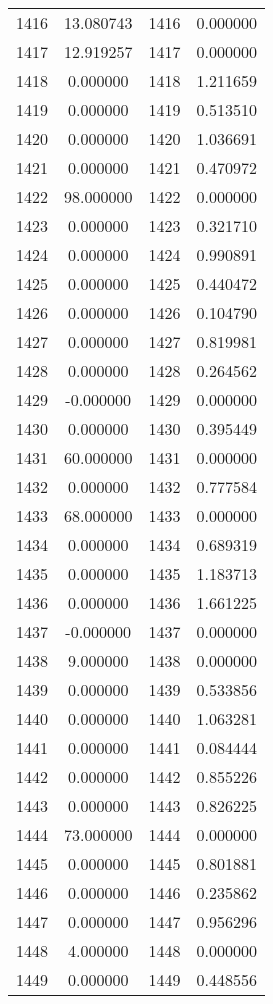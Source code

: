 \documentclass[12pt]{article}
\begin{document}
\begin{longtable}{@{}cccc@{}}
1416 & 13.080743 & 1416 & 0.000000 \\
1417 & 12.919257 & 1417 & 0.000000 \\
1418 & 0.000000 & 1418 & 1.211659 \\
1419 & 0.000000 & 1419 & 0.513510 \\
1420 & 0.000000 & 1420 & 1.036691 \\
1421 & 0.000000 & 1421 & 0.470972 \\
1422 & 98.000000 & 1422 & 0.000000 \\
1423 & 0.000000 & 1423 & 0.321710 \\
1424 & 0.000000 & 1424 & 0.990891 \\
1425 & 0.000000 & 1425 & 0.440472 \\
1426 & 0.000000 & 1426 & 0.104790 \\
1427 & 0.000000 & 1427 & 0.819981 \\
1428 & 0.000000 & 1428 & 0.264562 \\
1429 & -0.000000 & 1429 & 0.000000 \\
1430 & 0.000000 & 1430 & 0.395449 \\
1431 & 60.000000 & 1431 & 0.000000 \\
1432 & 0.000000 & 1432 & 0.777584 \\
1433 & 68.000000 & 1433 & 0.000000 \\
1434 & 0.000000 & 1434 & 0.689319 \\
1435 & 0.000000 & 1435 & 1.183713 \\
1436 & 0.000000 & 1436 & 1.661225 \\
1437 & -0.000000 & 1437 & 0.000000 \\
1438 & 9.000000 & 1438 & 0.000000 \\
1439 & 0.000000 & 1439 & 0.533856 \\
1440 & 0.000000 & 1440 & 1.063281 \\
1441 & 0.000000 & 1441 & 0.084444 \\
1442 & 0.000000 & 1442 & 0.855226 \\
1443 & 0.000000 & 1443 & 0.826225 \\
1444 & 73.000000 & 1444 & 0.000000 \\
1445 & 0.000000 & 1445 & 0.801881 \\
1446 & 0.000000 & 1446 & 0.235862 \\
1447 & 0.000000 & 1447 & 0.956296 \\
1448 & 4.000000 & 1448 & 0.000000 \\
1449 & 0.000000 & 1449 & 0.448556 \\

\end{longtable}
\end{document}
